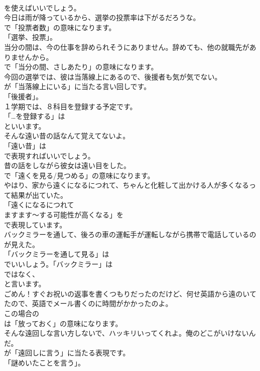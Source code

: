 \documentclass[8pt]{extreport}
\begin{document}
\begin{CJK}{UTF8}{min}
\\	を使えばいいでしょう。	
\\	今日は雨が降っているから、選挙の投票率は下がるだろうな。 
\\	で「投票者数」の意味になります。
\\	「選挙、投票」。	
\\	当分の間は、今の仕事を辞められそうにありません。辞めても、他の就職先がありませんから。 
\\	で「当分の間、さしあたり」の意味になります。	
\\	今回の選挙では、彼は当落線上にあるので、後援者も気が気でない。 
\\	が「当落線上にいる」に当たる言い回しです。
\\	「後援者」。	
\\	１学期では、８科目を登録する予定です。 
\\	「…を登録する」は
\\	といいます。	
\\	そんな遠い昔の話なんて覚えてないよ。 
\\	「遠い昔」は 
\\	で表現すればいいでしょう。	
\\	昔の話をしながら彼女は遠い目をした。 
\\	で「遠くを見る/見つめる」の意味になります。	
\\	やはり、家から遠くになるにつれて、ちゃんと化粧して出かける人が多くなるって結果が出ていた。 
\\	「遠くになるにつれて 
\\	ますます～する可能性が高くなる」を 
\\	で表現しています。	
\\	バックミラーを通して、後ろの車の運転手が運転しながら携帯で電話しているのが見えた。 
\\	「バックミラーを通して見る」は
\\	でいいしょう。「バックミラー」は
\\	ではなく、
\\	と言います。	
\\	ごめん！すぐお祝いの返事を書くつもりだったのだけど、何せ英語から遠のいてたので、英語でメール書くのに時間がかかったのよ。 
\\	この場合の 
\\	は「放っておく」の意味になります。	
\\	そんな遠回しな言い方しないで、ハッキリいってくれよ。俺のどこがいけないんだ。 
\\	が「遠回しに言う」に当たる表現です。
\\	「謎めいたことを言う」。	

\end{CJK}
\end{document}
